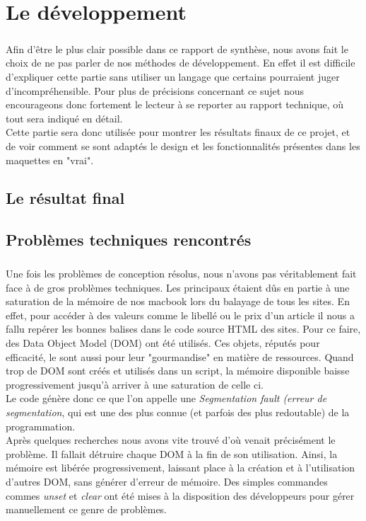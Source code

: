 \documentclass{report}
\begin{document}
\chapter{Le développement}

\paragraph{}
Afin d'être le plus clair possible dans ce rapport de synthèse, nous avons fait le choix de ne pas parler de nos méthodes de développement. En effet il est difficile d'expliquer cette partie sans utiliser un langage  que certains pourraient juger d'incompréhensible. Pour plus de précisions concernant ce sujet nous encourageons donc fortement le lecteur à se reporter au rapport technique, où tout sera indiqué en détail.\\
Cette partie sera donc utilisée pour montrer les résultats finaux de ce projet, et de voir comment se sont adaptés le design et les fonctionnalités présentes dans les maquettes en "vrai".


\section{Le résultat final}

\section{Problèmes techniques rencontrés}

\paragraph{}
Une fois les problèmes de conception résolus, nous n'avons pas véritablement fait face à de gros problèmes techniques. Les principaux étaient dûs en partie à une saturation de la mémoire de nos macbook lors du balayage de tous les sites. En effet, pour accéder à des valeurs comme le libellé ou le prix d'un article il nous a fallu repérer les bonnes balises dans le code source HTML des sites. Pour ce faire, des Data Object Model (DOM) ont été utilisés. Ces objets, réputés pour efficacité, le sont aussi pour leur "gourmandise" en matière de ressources. Quand trop de DOM sont créés et utilisés dans un script, la mémoire disponible baisse progressivement jusqu'à arriver à une saturation de celle ci.\\
Le code génère donc ce que l'on appelle une \textit{Segmentation fault (erreur de segmentation}, qui est une des plus connue (et parfois des plus redoutable) de la programmation.\\
Après quelques recherches nous avons vite trouvé d'où venait précisément le problème. Il fallait détruire chaque DOM à la fin de son utilisation. Ainsi, la mémoire est libérée progressivement, laissant place à la création et à l'utilisation d'autres DOM, sans générer d'erreur de mémoire. Des simples commandes commes \textit{unset} et \textit{clear} ont été mises à la disposition des développeurs pour gérer manuellement ce genre de problèmes.
\end{document}
